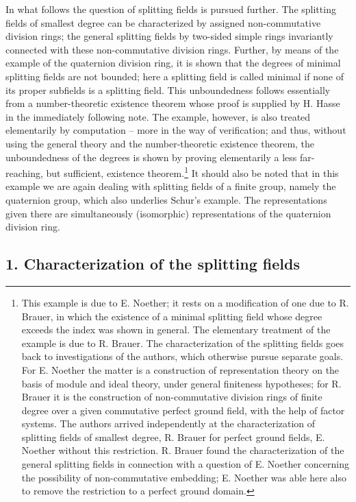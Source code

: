 \documentclass[11pt]{article}
\begin{document}
In what follows the question of splitting fields is pursued further. The splitting fields of smallest degree can be characterized by assigned non-commutative division rings; the general splitting fields by two-sided simple rings invariantly connected with these non-commutative division rings. Further, by means of the example of the quaternion division ring, it is shown that the degrees of minimal splitting fields are not bounded; here a splitting field is called minimal if none of its proper subfields is a splitting field. This unboundedness follows essentially from a number-theoretic existence theorem whose proof is supplied by H. Hasse in the immediately following note. The example, however, is also treated elementarily by computation -- more in the way of verification; and thus, without using the general theory and the number-theoretic existence theorem, the unboundedness of the degrees is shown by proving elementarily a less far-reaching, but sufficient, existence theorem.\footnote{This example is due to E. Noether; it rests on a modification of one due to R. Brauer, in which the existence of a minimal splitting field whose degree exceeds the index was shown in general. The elementary treatment of the example is due to R. Brauer. The characterization of the splitting fields goes back to investigations of the authors, which otherwise pursue separate goals. For E. Noether the matter is a construction of representation theory on the basis of module and ideal theory, under general finiteness hypotheses; for R. Brauer it is the construction of non-commutative division rings of finite degree over a given commutative perfect ground field, with the help of factor systems. The authors arrived independently at the characterization of splitting fields of smallest degree, R. Brauer for perfect ground fields, E. Noether without this restriction. R. Brauer found the characterization of the general splitting fields in connection with a question of E. Noether concerning the possibility of non-commutative embedding; E. Noether was able here also to remove the restriction to a perfect ground domain.} It should also be noted that in this example we are again dealing with splitting fields of a finite group, namely the quaternion group, which also underlies Schur's example. The representations given there are simultaneously (isomorphic) representations of the quaternion division ring.

\subsection*{1. Characterization of the splitting fields}
\end{document}
